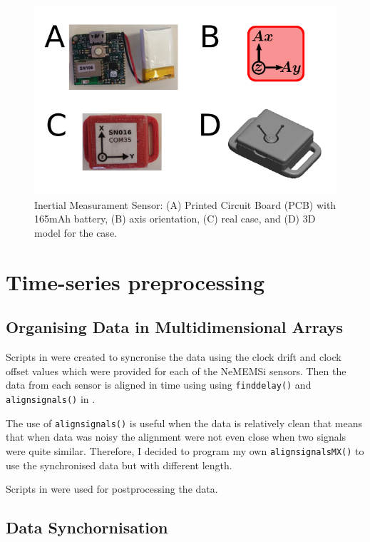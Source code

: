 \begin{figure}
 \centering
   \includegraphics[width=1.0\textwidth]{muse}
   \caption{Inertial Measurament Sensor:
		(A) Printed Circuit Board (PCB) with 165mAh battery,
		(B) axis orientation, 
		(C) real case, and 
		(D) 3D model for the case.
}
   \label{fig:muse}
\end{figure}

\section{Time-series preprocessing}
\subsection{Organising Data in Multidimensional Arrays}

Scripts in \MATLAB were created to syncronise the data using the clock drift and clock
offset values which were provided for each of the NeMEMSi sensors.
Then the data from each sensor is aligned in time using using
\texttt{finddelay()} and \texttt{alignsignals()} in \MATLAB.

The use of \texttt{alignsignals()} is useful when the data is relatively clean
that means that when data was noisy the alignment were not even close
when two signals were quite similar. Therefore, I decided to
program my own \texttt{alignsignalsMX()} to use the synchronised
data but with different length.


Scripts in \R  were used for postprocessing the data.

\subsection{Data Synchornisation}

